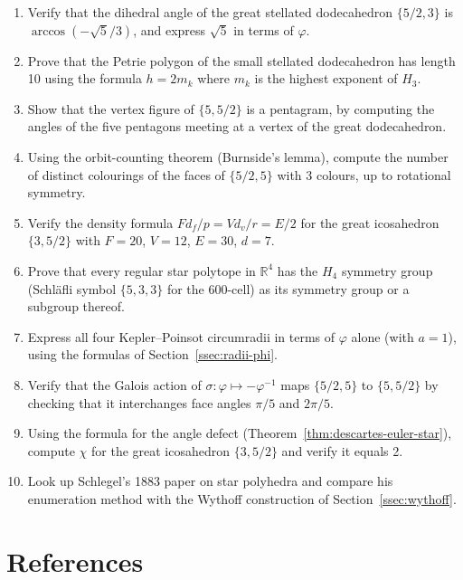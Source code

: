\begin{enumerate}
  \item Verify that the dihedral angle of the great stellated
        dodecahedron $\{5/2,3\}$ is $\arccos(-\sqrt5/3)$,
        and express $\sqrt5$ in terms of $\varphi$.
  \item Prove that the Petrie polygon of the small stellated
        dodecahedron has length 10 using the formula
        $h = 2m_k$ where $m_k$ is the highest exponent of $H_3$.
  \item Show that the vertex figure of $\{5,5/2\}$ is a
        pentagram, by computing the angles of the five pentagons
        meeting at a vertex of the great dodecahedron.
  \item Using the orbit-counting theorem (Burnside's lemma),
        compute the number of distinct colourings of the faces
        of $\{5/2,5\}$ with 3 colours, up to rotational
        symmetry.
  \item Verify the density formula
        $F d_f / p = V d_v / r = E/2$ for the great icosahedron
        $\{3,5/2\}$ with $F=20$, $V=12$, $E=30$, $d=7$.
  \item Prove that every regular star polytope in $\mathbb{R}^4$
        has the $H_4$ symmetry group (Schläfli symbol
        $\{5,3,3\}$ for the 600-cell) as its symmetry group or
        a subgroup thereof.
  \item Express all four Kepler–Poinsot circumradii in terms of
        $\varphi$ alone (with $a=1$), using the formulas of
        Section~\ref{ssec:radii-phi}.
  \item Verify that the Galois action of
        $\sigma: \varphi \mapsto -\varphi^{-1}$ maps
        $\{5/2,5\}$ to $\{5,5/2\}$ by checking that it
        interchanges face angles $\pi/5$ and $2\pi/5$.
  \item Using the formula for the angle defect
        (Theorem~\ref{thm:descartes-euler-star}), compute
        $\chi$ for the great icosahedron $\{3,5/2\}$ and
        verify it equals 2.
  \item Look up Schlegel's 1883 paper on star polyhedra and
        compare his enumeration method with the Wythoff
        construction of Section~\ref{ssec:wythoff}.
\end{enumerate}

\section{References}
\label{sec:references-ch15}

